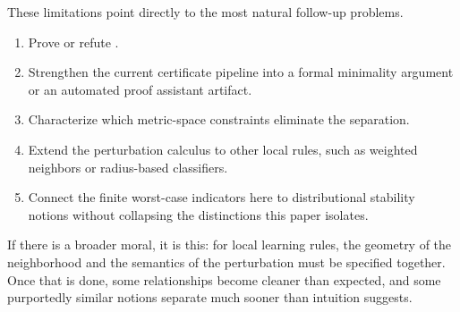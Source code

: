 These limitations point directly to the most natural follow-up problems.
\begin{enumerate}[leftmargin=*,label=(\arabic*)]
    \item Prove or refute .
    \item Strengthen the current certificate pipeline into a formal minimality
    argument or an automated proof assistant artifact.
    \item Characterize which metric-space constraints eliminate the separation.
    \item Extend the perturbation calculus to other local rules, such as
    weighted neighbors or radius-based classifiers.
    \item Connect the finite worst-case indicators here to distributional
    stability notions without collapsing the distinctions this paper isolates.
\end{enumerate}

If there is a broader moral, it is this: for local learning rules, the geometry
of the neighborhood and the semantics of the perturbation must be specified
together. Once that is done, some relationships become cleaner than expected,
and some purportedly similar notions separate much sooner than intuition
suggests.
